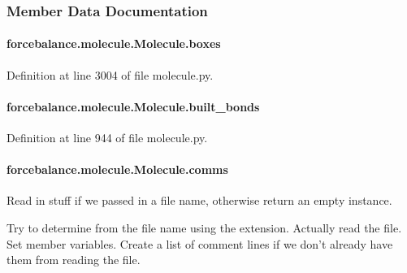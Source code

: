 \subsubsection{Member Data Documentation}
\hypertarget{classforcebalance_1_1molecule_1_1Molecule_a9b3fb36e61a914b9f0e2c1613357736a}{
\paragraph[{boxes}]{\setlength{\rightskip}{0pt plus 5cm}forcebalance.\-molecule.\-Molecule.\-boxes}}\label{classforcebalance_1_1molecule_1_1Molecule_a9b3fb36e61a914b9f0e2c1613357736a}


Definition at line 3004 of file molecule.\-py.

\hypertarget{classforcebalance_1_1molecule_1_1Molecule_aeb5135f20e02b98900b6fa3fbab9822d}{
\paragraph[{built\-\_\-bonds}]{\setlength{\rightskip}{0pt plus 5cm}forcebalance.\-molecule.\-Molecule.\-built\-\_\-bonds}}\label{classforcebalance_1_1molecule_1_1Molecule_aeb5135f20e02b98900b6fa3fbab9822d}


Definition at line 944 of file molecule.\-py.

\hypertarget{classforcebalance_1_1molecule_1_1Molecule_adf9f25ebcf955be562ef186b822e237a}{
\paragraph[{comms}]{\setlength{\rightskip}{0pt plus 5cm}forcebalance.\-molecule.\-Molecule.\-comms}}\label{classforcebalance_1_1molecule_1_1Molecule_adf9f25ebcf955be562ef186b822e237a}


Read in stuff if we passed in a file name, otherwise return an empty instance. 

Try to determine from the file name using the extension. Actually read the file. Set member variables. Create a list of comment lines if we don't already have them from reading the file. 

